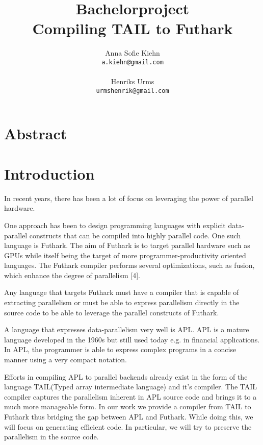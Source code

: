 \documentclass[11pt]{article}
\author{
  \Large{Anna Sofie Kiehn}
  \\ \texttt{a.kiehn@gmail.com} \\ \\
  \Large{Henriks Urms}
  \\ \texttt{urmshenrik@gmail.com}
}
\title{
  \vspace{3cm}
  \Huge{Bachelorproject} \\
  \Large{Compiling TAIL to Futhark}
}
\begin{document}


\clearpage\maketitle
\thispagestyle{empty}

\newpage

\section{Abstract}

\section{Introduction}
In recent years, there has been a lot of focus on leveraging the power of parallel hardware. 

One approach has been to design programming languages with explicit data-parallel constructs that can be compiled into highly parallel code. One such language is Futhark. The aim of Futhark is to target parallel hardware such as GPUs while itself being the target of more programmer-productivity oriented languages. The Futhark compiler performs several optimizations, such as fusion, which enhance the degree of parallelism [4].

Any language that targets Futhark must have a compiler that is capable of extracting parallelism or must be able to express parallelism directly in the source code to be able to leverage the parallel constructs of Futhark.

A language that expresses data-parallelism very well is APL. APL is a mature language developed in the 1960s but still used today e.g. in financial applications. In APL, the programmer is able to express complex programs in a concise manner using a very compact notation.

Efforts in compiling APL to parallel backends already exist in the form of the language TAIL(Typed array intermediate language) and it’s compiler. The TAIL compiler captures the parallelism inherent in APL source code and brings it to a much more manageable form. In our work we provide a compiler from TAIL to Futhark thus bridging the gap between APL and Futhark. While doing  this, we will focus on generating efficient code. In particular, we will try to preserve the parallelism in the source code.
\end{document}
